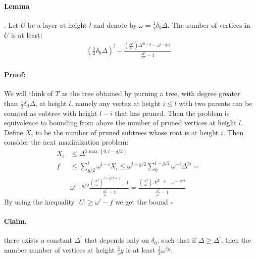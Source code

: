 \documentclass{article}
\begin{document}
\begin{multicols*}{2}
\paragraph{Lemma}. Let $U$ be a layer at height $l$ and denote by $ \omega = \frac{1}{2}\delta_{0}\Delta$. The number of vertices in $U$ is at least: 
\begin{equation*}
  \begin{split}
    \left( \frac{1}{2}\delta_0\Delta \right)^{l}- \frac{\left( \frac{\Delta^{2}}{\omega} \right)\Delta^{2l-g} - \omega^{l-g/2} }{\frac{\Delta^{2}}{\omega}-1}
  \end{split}
\end{equation*}

\paragraph{Proof:} We will think of $T$ as the tree obtained by purning a tree, with degree greater than $\frac{1}{2}\delta_{0}\Delta$, at height $l$, namely any vertex at height $i \le l $ with two parents can be counted as subtree with height $l-i$ that has pruned. Then the problem is equivalence to bounding from above the number of pruned vertices at height $l$. Define $X_{i}$ to be the number of pruned subtrees whose root is at height $i$. Then consider the next maximization problem: 
\begin{equation*}
  \begin{split}
    X_{i} & \le \Delta^{2\max \left\{ 0, l-g/2 \right\}} \\ 
    f & \le \sum_{g/2}^{l}{\omega^{l-i}X_{i} } \le \omega^{l-g/2}\sum_{0}^{l-g/2}{\omega^{-i}\Delta^{2i} } = \\ & \omega^{l-g/2}\frac{\left( \frac{\Delta^{2}}{\omega} \right)^{l-g/2+1}-1}{\frac{\Delta^{2}}{\omega}-1} =  
      \frac{\left( \frac{\Delta^{2}}{\omega} \right)\Delta^{2l-g} - \omega^{l-g/2} }{\frac{\Delta^{2}}{\omega}-1}
  \end{split}
\end{equation*}
By using the inequality $ |U| \ge \omega^{l} - f $ we get the bound $\square$ 
\paragraph{Claim.} there exists a constant $\Delta^{\prime}$ that depends only on $\delta_{0}$, such that if $\Delta \ge \Delta^{\prime}$, then the number number of vertices at height $\frac{3}{4}g$ is at least $ \frac{1}{2}\omega^{\frac{3}{4}g} $.


\end{multicols*}
\end{document}

